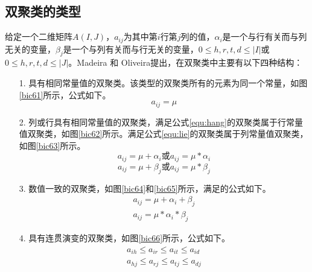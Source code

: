   \subsection{双聚类的类型}
    给定一个二维矩阵$A(I,J)$，$a_{ij}$为其中第$i$行第$j$列的值，$\alpha_i$是一个与行有关而与列无关的变量，$\beta_j$是一个与列有关而与行无关的变量，$0\le h,r,t,d \le |I|$或$0\le h,r,t,d \le |J|$。Madeira 和 Oliveira提出，在双聚类中主要有以下四种结构：
    \begin{enumerate}
        \item[1.] 具有相同常量值的双聚类。该类型的双聚类所有的元素为同一个常量，如图\ref{bic61}所示，公式如下。
        \begin{equation}
         a_{ij}=\mu
        \end{equation}

        \item[2.] 列或行具有相同常量值的双聚类，满足公式\ref{equ:hang}的双聚类属于行常量值双聚类，如图\ref{bic62}所示。满足公式\ref{equ:lie}的双聚类属于列常量值双聚类，如图\ref{bic63}所示。
        \begin{equation}\label{equ:hang}
        a_{ij}=\mu+\alpha_i \mbox{或} a_{ij}=\mu *\alpha_i 
        \end{equation}
        \begin{equation}\label{equ:lie}
        a_{ij}=\mu+\beta_j  \mbox{或} a_{ij}=\mu *\beta_j
        \end{equation}
        
        \item[3.] 数值一致的双聚类，如图\ref{bic64}和\ref{bic65}所示，满足的公式如下。
        \begin{align}
        a_{ij}=\mu+\alpha_i+\beta_j \label{equ:jiafa}\\
        a_{ij}=\mu *\alpha_i*\beta_j\label{equ:chengfa}
        \end{align} 

        \item[4.] 具有连贯演变的双聚类，如图\ref{bic66}所示，公式如下。
        \begin{align}
        a_{ih}\le a_{ir}\le a_{it}\le a_{id} \\
        a_{hj}\le a_{rj}\le a_{tj}\le  a_{dj} 
        \end{align}
    \end{enumerate}

